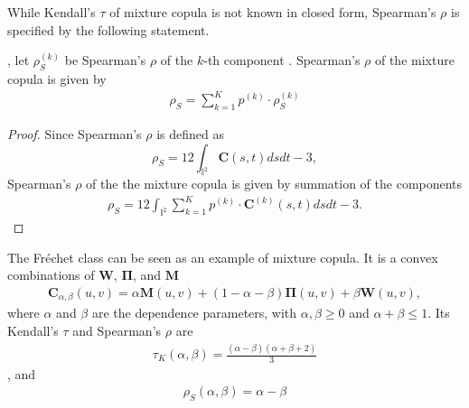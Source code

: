 While Kendall's $\tau$ of mixture copula is not known in closed form,
Spearman's $\rho$ is specified by the following statement. 

\begin{proposition}
  , 
  let $\rho_S^{(k)}$ be Spearman's $\rho$ of the $k$-th component
  . 
  Spearman's $\rho$ of the mixture copula is given by 
  \begin{align}
        \rho_S = \sum_{k=1}^K p^{(k)} \cdot \rho_S^{(k)}
        \end{align}
    \end{proposition}

\begin{proof}
    Since Spearman's $\rho$ is defined as \citep{Nelsen1999}
    \begin{equation*}
      \rho_S = 12 \int_{\mathbb{I}^2} \bm{C}(s,t) ds dt - 3,
    \end{equation*}
    Spearman's $\rho$ of the the mixture copula is given by summation
    of the components 
       \begin{align}
        \rho_S = 12 \int_{\mathbb{I}^2} \sum_{k=1}^K p^{(k)} \cdot
         \bm{C}^{(k)}(s,t) ds dt - 3. 
        \end{align}
    \end{proof}

    
\begin{example}
    The Fr{\'e}chet class can be seen as an example of mixture copula.
    It is a convex combinations of $\bm{W}$, $\bm{\Pi}$, and $\bm{M}$ \citep{Nelsen1999}
    \begin{align}
        \bm{C}_{\alpha, \beta}(u,v)
        = \alpha \bm{M}(u,v) +
        (1-\alpha-\beta)\bm{\Pi}(u,v)
        +\beta \bm{W}(u,v),
        \end{align}
    where $\alpha$ and $\beta$ are the dependence parameters, with $\alpha, \beta \geq 0$ and
    $\alpha+\beta \leq 1$.
    Its Kendall's $\tau$ and Spearman's $\rho$ are
    \begin{align}
        \tau_K(\alpha, \beta) = \frac{(\alpha - \beta)(\alpha+\beta+2)}{3}
        \end{align}
    , and
    \begin{align}
        \rho_S(\alpha, \beta) = \alpha - \beta
        \end{align}
    \end{example}\medskip

